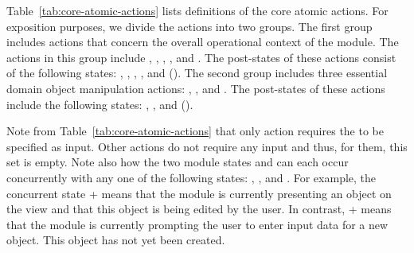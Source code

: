 %
Table~\ref{tab:core-atomic-actions} lists definitions of the core atomic actions. %
For exposition purposes, we divide the actions into two groups. %
The first group includes actions that concern the overall operational context of the module.
The actions in this group include , , , , and . The post-states of these actions consist of the following states: , , , , and  (\resp). 
%
The second group includes three essential domain object manipulation actions: , , and . The post-states of these actions include the following states: , , and  (\resp).
%

Note from Table~\ref{tab:core-atomic-actions} that only action  requires the  to be specified as input. Other actions do not require any input and thus, for them, this set is empty. Note also how the two module states  and  can each occur concurrently with any one of the following states: , , and . For example, the concurrent state  +  means that the module is currently presenting an object on the view and that this object is being edited by the user. In contrast,  +  means that the module is currently prompting the user to enter input data for a new object. This object has not yet been created.
